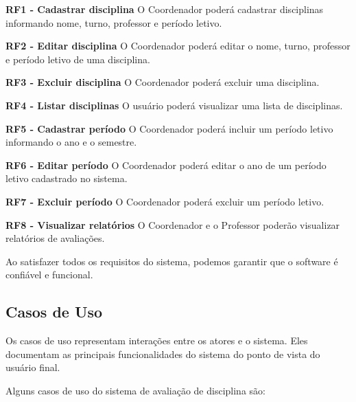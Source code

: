 \begin{alineas}
    \item \textbf{RF1 - Cadastrar disciplina} O Coordenador poderá cadastrar disciplinas informando nome, turno, professor e período letivo.
    \item \textbf{RF2 - Editar disciplina} O Coordenador poderá editar o nome, turno, professor e período letivo de uma disciplina.
    \item \textbf{RF3 - Excluir disciplina} O Coordenador poderá excluir uma disciplina.
    \item \textbf{RF4 - Listar disciplinas} O usuário poderá visualizar uma lista de disciplinas.
    \item \textbf{RF5 - Cadastrar período} O Coordenador poderá incluir um período letivo informando o ano e o semestre.
    \item \textbf{RF6 - Editar período} O Coordenador poderá editar o ano de um período letivo cadastrado no sistema.
    \item \textbf{RF7 - Excluir período} O Coordenador poderá excluir um período letivo.
    \item \textbf{RF8 - Visualizar relatórios} O Coordenador e o Professor poderão visualizar relatórios de avaliações.
\end{alineas}

Ao satisfazer todos os requisitos do sistema, podemos garantir que o software é confiável e funcional. 

\subsection{Casos de Uso}
Os casos de uso representam interações entre os atores e o sistema. Eles documentam as principais funcionalidades do sistema do ponto de vista do usuário final. 


Alguns casos de uso do sistema de avaliação de disciplina são:


